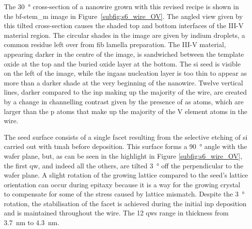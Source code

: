 The \qty{30}{\degree} cross-section of a nanowire grown with this revised recipe is shown in the \acs{bf}-\acs{stem_m} image in Figure~\ref{subfig:s6_wire_OV}. The angled view given by this tilted cross-section causes the shaded top and bottom interfaces of the III-V material region. The circular shades in the image are given by indium droplets, a common residue left over from \acs{fib} lamella preparation. The III-V material, appearing darker in the centre of the image, is sandwiched between the template oxide at the top and the buried oxide layer at the bottom. The \acs{si} seed is visible on the left of the image, while the \acs{ingaas} nucleation layer is too thin to appear as more than a darker shade at the very beginning of the nanowire. Twelve vertical lines, darker compared to the \acs{inp} making up the majority of the wire, are created by a change in channelling contrast given by the presence of \acl{as} atoms, which are larger than the \acl{p} atoms that make up the majority of the V element atoms in the wire.

The seed surface consists of a single  facet resulting from the selective etching of \acs{si} carried out with \acs{tmah} before deposition. This surface forms a \qty{90}{\degree} angle with the wafer plane, but, as can be seen in the highlight in Figure \ref{subfig:s6_wire_OV}, the first \acl{qw}, and indeed all the others, are tilted \qty{3}{\degree} off the perpendicular to the wafer plane. A slight rotation of the growing lattice compared to the seed's lattice orientation can occur during epitaxy because it is a way for the growing crystal to compensate for some of the stress caused by lattice mismatch. Despite the \qty{3}{\degree} rotation, the stabilisation of the  facet is achieved during the initial \acs{inp} deposition and is maintained throughout the wire. The \num{12} \acl{qw}s range in thickness from \qty{3.7}{\nano\metre} to \qty{4.3}{\nano\metre}.

